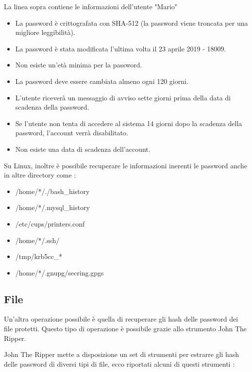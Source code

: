 La linea sopra contiene le informazioni dell'utente "Mario"

\begin{itemize}
    \item La password è crittografata con SHA-512 (la password viene troncata per una migliore leggibilità).
    \item La password è stata modificata l'ultima volta il 23 aprile 2019 - 18009.
    \item Non esiste un'età minima per la password.
    \item La password deve essere cambiata almeno ogni 120 giorni.
    \item L'utente riceverà un messaggio di avviso sette giorni prima della data di scadenza della password.
    \item Se l'utente non tenta di accedere al sistema 14 giorni dopo la scadenza della password, l'account verrà disabilitato.
    \item Non esiste una data di scadenza dell'account.
\end{itemize}

Su Linux, inoltre è possibile recuperare le informazioni inerenti le password anche in altre directory come :

\begin{itemize}
    \item /home/*/./bash\_history
    \item /home/*/.mysql\_history
    \item /etc/cups/printers.conf
    \item /home/*/.ssh/
    \item /tmp/krb5cc\_*
    \item /home/*/.gnupg/secring.gpgs
\end{itemize}

\subsection{File}

Un'altra operazione possibile è quella di recuperare gli hash delle password dei file protetti. Questo tipo di operazione è possibile grazie allo strumento John The Ripper.

John The Ripper mette a disposizione un set di strumenti per estrarre gli hash delle password di diversi tipi di file, ecco riportati alcuni di questi strumenti :


